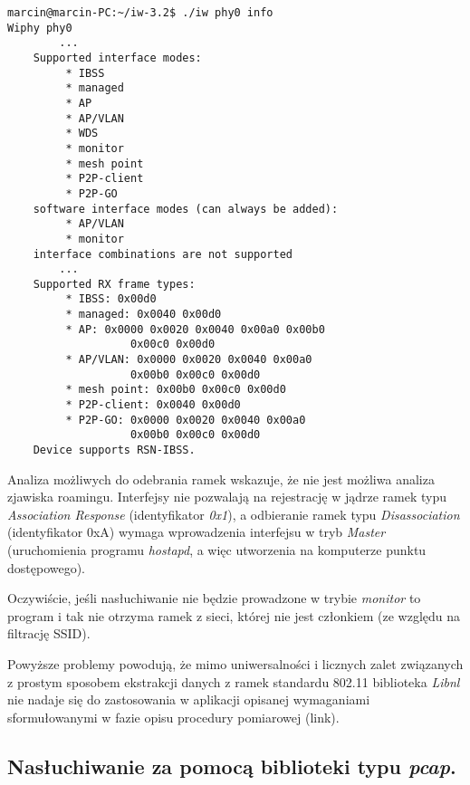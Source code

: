 \begin{lstlisting}[frame=tb]
marcin@marcin-PC:~/iw-3.2$ ./iw phy0 info
Wiphy phy0
        ...
	Supported interface modes:
		 * IBSS
		 * managed
		 * AP
		 * AP/VLAN
		 * WDS
		 * monitor
		 * mesh point
		 * P2P-client
		 * P2P-GO
	software interface modes (can always be added):
		 * AP/VLAN
		 * monitor
	interface combinations are not supported
        ...
	Supported RX frame types:
		 * IBSS: 0x00d0
		 * managed: 0x0040 0x00d0
		 * AP: 0x0000 0x0020 0x0040 0x00a0 0x00b0 
                   0x00c0 0x00d0
		 * AP/VLAN: 0x0000 0x0020 0x0040 0x00a0 
                   0x00b0 0x00c0 0x00d0
		 * mesh point: 0x00b0 0x00c0 0x00d0
		 * P2P-client: 0x0040 0x00d0
		 * P2P-GO: 0x0000 0x0020 0x0040 0x00a0 
                   0x00b0 0x00c0 0x00d0
	Device supports RSN-IBSS.
\end{lstlisting}

Analiza możliwych do odebrania ramek wskazuje, że nie jest możliwa analiza zjawiska roamingu. Interfejsy nie pozwalają na rejestrację w jądrze ramek typu \emph{Association Response} (identyfikator \emph{0x1}), a odbieranie ramek typu \emph{Disassociation} (identyfikator 0xA) wymaga wprowadzenia interfejsu w tryb \emph{Master} (uruchomienia programu \emph{hostapd}, a więc utworzenia na komputerze punktu dostępowego). 

Oczywiście, jeśli nasłuchiwanie nie będzie prowadzone w trybie \emph{monitor} to program i tak nie otrzyma ramek z sieci, której nie jest członkiem (ze względu na filtrację SSID). 

Powyższe problemy powodują, że mimo uniwersalności i licznych zalet związanych z prostym sposobem ekstrakcji danych z ramek standardu 802.11 biblioteka \emph{Libnl} nie nadaje się do zastosowania w aplikacji opisanej wymaganiami sformułowanymi w fazie opisu procedury pomiarowej (link). 

\subsection{Nasłuchiwanie za pomocą biblioteki typu \emph{pcap}.}

 
